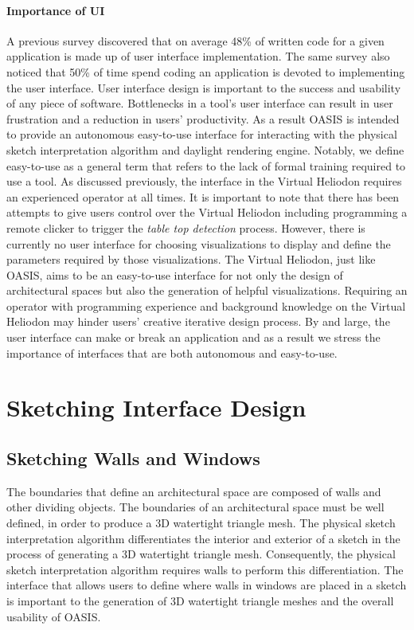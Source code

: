 \clearpage

\paragraph{Importance of UI}\label{ui_importance}
A previous survey discovered that on average 48\% of written code for a given application is made up of user interface implementation\cite{Myers1992}.
The same survey also noticed that 50\% of time spend coding an application is devoted to implementing the user interface\cite{Myers1992}.
User interface design is important to the success and usability of any piece of software.
Bottlenecks in a tool's user interface can result in user frustration and a reduction in users' productivity.
As a result OASIS is intended to provide an autonomous easy-to-use interface for interacting with the physical sketch interpretation algorithm and daylight rendering engine.
Notably, we define easy-to-use  as a general term that refers to the lack of formal training required to use a tool.
As discussed previously, the interface in the Virtual Heliodon requires an experienced operator at all times.
It is important to note that there has been attempts to give users control over the Virtual Heliodon including programming a remote clicker to trigger the \textit{table top detection} process.
However, there is currently no user interface for choosing visualizations to display and define the parameters required by those visualizations.
The Virtual Heliodon, just like OASIS, aims to be an easy-to-use interface for not only the design of architectural spaces but also the generation of helpful visualizations.
Requiring an operator with programming experience and background knowledge on the Virtual Heliodon may hinder users' creative iterative design process.
By and large, the user interface can make or break an application and as a result we stress the importance of interfaces that are both autonomous and easy-to-use.

\section{Sketching Interface Design}

\subsection{Sketching Walls and Windows}
The boundaries that define an architectural space are composed of walls and other dividing objects.
The  boundaries of an architectural space must be well defined, in order to produce a 3D watertight triangle mesh.
The physical sketch interpretation algorithm differentiates the interior and exterior of a sketch in the process of generating a 3D watertight triangle mesh.
Consequently, the physical sketch interpretation algorithm requires walls to perform this differentiation\cite{cutler2010interpreting}.
The interface that allows users to define where walls in windows are placed in a sketch is important to the generation of 3D watertight triangle meshes and the overall usability of OASIS.\\
 
